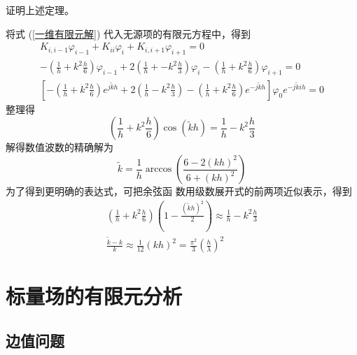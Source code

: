 \begin{exercise}
    证明上述定理。
\end{exercise}

\begin{solution}
    将式 (\ref{一维有限元解}) 代入无源项的有限元方程中，得到
    \begin{gather*}
        K_{i,i-1}\varphi_{i-1}+K_{ii}\varphi_i+K_{i,i+1}\varphi_{i+1}
        =0\\
        -\left(\frac{1}{h}+k^2\frac{h}{6}\right)
        \varphi_{i-1}
        +2\left(\frac{1}{h}+-k^2\frac{h}{3}\right)
        \varphi_i
        -\left(\frac{1}{h}+k^2\frac{h}{6}\right)
        \varphi_{i+1}
        =0\\
        \left[
            -\left(\frac{1}{h}+k^2\frac{h}{6}\right)
            e^{j\tilde{k}h}
            +2\left(\frac{1}{h}-k^2\frac{h}{3}\right)
            -\left(\frac{1}{h}+k^2\frac{h}{6}\right)
            e^{-j\tilde{k}h}
        \right]\varphi_0e^{-j\tilde{k}ih}
        =0
    \end{gather*}
    整理得
    \begin{equation*}
        \left(
            \frac{1}{h}+k^2\frac{h}{6}
        \right)\cos(\tilde{k}h)
        =\frac{1}{h}-k^2\frac{h}{3}
    \end{equation*}
    解得数值波数的精确解为
    \begin{equation*}
        \tilde{k}=\frac{1}{h}
        \arccos\left(
            \frac{6-2(kh)^2}{6+(kh)^2}
        \right)
    \end{equation*}
    为了得到更明确的表达式，可把余弦函
    数用级数展开式的前两项近似表示，得到
    \begin{gather*}
        \left(
            \frac{1}{h}+k^2\frac{h}{6}
        \right)\left(
            1-\frac{(\tilde{k}h)^2}{2}
        \right)
        \approx\frac{1}{h}-k^2\frac{h}{3}\\
        \frac{\tilde{k}-k}{k}
        \approx\frac{1}{12}(kh)^2
        =\frac{\pi^2}{3}\left(\frac{h}{\lambda}\right)^2
    \end{gather*}
\end{solution}

\section{标量场的有限元分析}

\subsection{边值问题}

